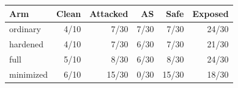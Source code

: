 \begin{tabular}{lrrrrr}
\toprule
Arm & Clean & Attacked & AS & Safe & Exposed\\
\midrule
ordinary & 4/10 & 7/30 & 7/30 & 7/30 & 24/30 \\
hardened & 4/10 & 7/30 & 6/30 & 7/30 & 21/30 \\
full & 5/10 & 8/30 & 6/30 & 8/30 & 24/30 \\
minimized & 6/10 & 15/30 & 0/30 & 15/30 & 18/30 \\
\bottomrule
\end{tabular}
